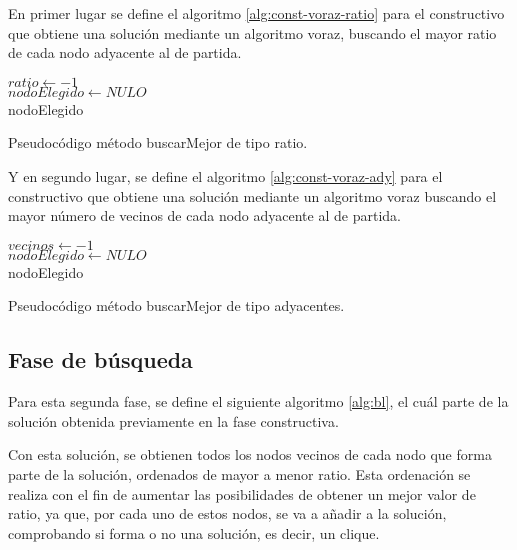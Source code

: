 En primer lugar se define el algoritmo \ref{alg:const-voraz-ratio} para el constructivo que obtiene una solución mediante un algoritmo voraz, buscando el mayor ratio de cada nodo adyacente al de partida.\\

\begin{algorithm}
	$ ratio \gets -1 $ \\[0.2cm]
	$ nodoElegido \gets NULO $ \\[0.2cm]
	\Return nodoElegido
	\caption{Pseudocódigo método buscarMejor de tipo ratio.}
	\label{alg:const-voraz-ratio}
\end{algorithm}


Y en segundo lugar, se define el algoritmo \ref{alg:const-voraz-ady} para el constructivo que obtiene una solución mediante un algoritmo voraz buscando el mayor número de vecinos de cada nodo adyacente al de partida.\\

\begin{algorithm}
	$ vecinos \gets -1 $ \\[0.2cm]
	$ nodoElegido \gets NULO $ \\[0.2cm]
	\Return nodoElegido
	\caption{Pseudocódigo método buscarMejor de tipo adyacentes.}
	\label{alg:const-voraz-ady}
\end{algorithm}

\subsection{Fase de búsqueda}
Para esta segunda fase, se define el siguiente algoritmo \ref{alg:bl}, el cuál parte de la solución obtenida previamente en la fase constructiva.

Con esta solución, se obtienen todos los nodos vecinos de cada nodo que forma parte de la solución, ordenados de mayor a menor ratio. Esta ordenación se realiza con el fin de aumentar las posibilidades de obtener un mejor valor de ratio, ya que, por cada uno de estos nodos, se va a añadir a la solución, comprobando si forma o no una solución, es decir, un clique.

